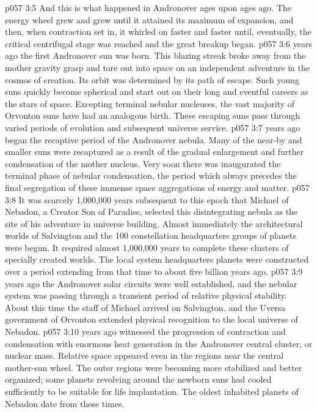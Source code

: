 \vs p057 3:5 And this is what happened in Andronover ages upon ages ago. The energy wheel grew and grew until it attained its maximum of expansion, and then, when contraction set in, it whirled on faster and faster until, eventually, the critical centrifugal stage was reached and the great breakup began.
\vs p057 3:6 \pc {} years ago the first Andronover sun was born. This blazing streak broke away from the mother gravity grasp and tore out into space on an independent adventure in the cosmos of creation. Its orbit was determined by its path of escape. Such young suns quickly become spherical and start out on their long and eventful careers as the stars of space. Excepting terminal nebular nucleuses, the vast majority of Orvonton suns have had an analogous birth. These escaping suns pass through varied periods of evolution and subsequent universe service.
\vs p057 3:7 \pc {} years ago began the recaptive period of the Andronover nebula. Many of the near\hyp{}by and smaller suns were recaptured as a result of the gradual enlargement and further condensation of the mother nucleus. Very soon there was inaugurated the terminal phase of nebular condensation, the period which always precedes the final segregation of these immense space aggregations of energy and matter.
\vs p057 3:8 It was scarcely 1,000,000 years subsequent to this epoch that Michael of Nebadon, a Creator Son of Paradise, selected this disintegrating nebula as the site of his adventure in universe building. Almost immediately the architectural worlds of Salvington and the 100 constellation headquarters groups of planets were begun. It required almost 1,000,000 years to complete these clusters of specially created worlds. The local system headquarters planets were constructed over a period extending from that time to about five billion years ago.
\vs p057 3:9 \pc {} years ago the Andronover solar circuits were well established, and the nebular system was passing through a transient period of relative physical stability. About this time the staff of Michael arrived on Salvington, and the Uversa government of Orvonton extended physical recognition to the local universe of Nebadon.
\vs p057 3:10 \pc {} years ago witnessed the progression of contraction and condensation with enormous heat generation in the Andronover central cluster, or nuclear mass. Relative space appeared even in the regions near the central mother\hyp{}sun wheel. The outer regions were becoming more stabilized and better organized; some planets revolving around the newborn suns had cooled sufficiently to be suitable for life implantation. The oldest inhabited planets of Nebadon date from these times.
